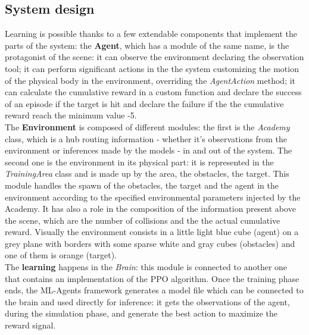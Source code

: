 \documentclass{ifacconf}
\begin{document}
\subsection{System design} 
Learning is possible thanks to a few extendable components that implement the parts of the system: the \textbf{Agent}, which has a module of the same name, is the protagonist of the scene: it can observe the environment declaring the observation tool; it can perform significant actions in the the system customizing the motion of the physical body in the environment, overriding the \emph{AgentAction} method; it can calculate the cumulative reward in a custom function and declare the success of an episode if the target is hit and declare the failure if the the cumulative reward reach the minimum value -5.\\
The \textbf{Environment} is composed of different modules: the first is the \emph{Academy} class, which is a hub routing information - whether it's observations from the environment or inferences made by the models - in and out of the system. The second one is the environment in its physical part: it is represented in the \emph{TrainingArea} class and is made up by the area, the obstacles, the target. This module handles the spawn of the obstacles, the target and the agent in the environment according to the specified environmental parameters injected by the Academy. It has also a role in the composition of the information present above the scene, which are the number of collisions and the the actual cumulative reward. Visually the environment consists in a little light blue cube (agent) on a grey plane with borders with some sparse white and gray cubes (obstacles) and one of them is orange (target). \\ 
The \textbf{learning} happens in the \emph{Brain}: this module is connected to another one that contains an implementation of the PPO algorithm. Once the training phase ends, the ML-Agents framework generates a model file which can be connected to the brain and used directly for inference: it gets the observations of the agent, during the simulation phase, and generate the best action to maximize the reward signal.
\end{document}

